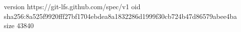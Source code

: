 version https://git-lfs.github.com/spec/v1
oid sha256:8a525f9920fff27bf1704ebdea8a1832286d1999f30cb724b47d86579abee4ba
size 43840
